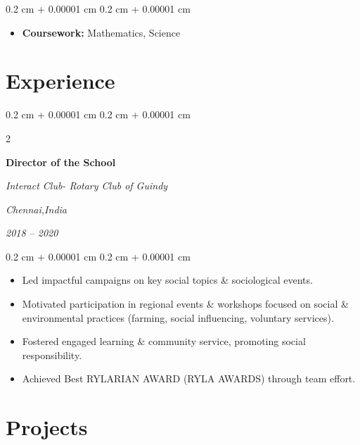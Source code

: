\documentclass[10pt, letterpaper]{article}
\newenvironment{highlights}{
    \begin{itemize}[
        topsep=0.10 cm,
        parsep=0.10 cm,
        partopsep=0pt,
        itemsep=0pt,
        leftmargin=0.4 cm + 10pt
    ]
}{
    \end{itemize}
} %
\newenvironment{onecolentry}{
    \begin{adjustwidth}{
        0.2 cm + 0.00001 cm
    }{
        0.2 cm + 0.00001 cm
    }
}{
    \end{adjustwidth}
}
\newenvironment{twocolentry}[2][]{
    \onecolentry
    \def\secondColumn{#2}
    \setcolumnwidth{\fill, 4.5 cm}
    \begin{paracol}{2}
}{
    \switchcolumn \raggedleft \secondColumn
    \end{paracol}
    \endonecolentry
}
\begin{document}
        \begin{onecolentry}
            \begin{highlights}
                \item \textbf{Coursework:} Mathematics, Science
            \end{highlights}
        \end{onecolentry}
        


    \section{Experience}



        
        \begin{twocolentry}{
        \textit{Chennai,India}    
            
        \textit{2018 – 2020}}
            \textbf{Director of the School}
            
            \textit{Interact Club- Rotary Club of Guindy }
        \end{twocolentry}

        \vspace{0.10 cm}
        \begin{onecolentry}
            \begin{highlights}
                \item Led impactful campaigns on key social topics \& sociological events. 
                \item Motivated participation in regional events \& workshops focused on social \& environmental practices (farming, social influencing, voluntary services).  
                \item  Fostered engaged learning \& community service, promoting social responsibility. 
                \item Achieved Best RYLARIAN AWARD (RYLA AWARDS) through team effort.  
            \end{highlights}
        \end{onecolentry}


        \vspace{0.2 cm}

     



    



    
    \section{Projects}
\end{document}
